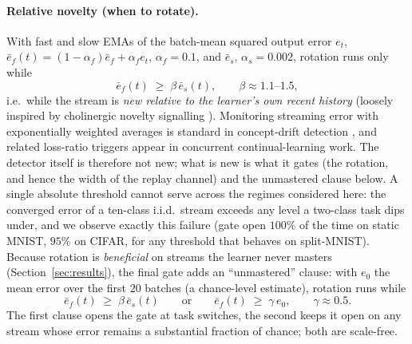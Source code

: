 \documentclass{article}
\begin{document}
\paragraph{Relative novelty (when to rotate).} With fast and slow EMAs of the batch-mean
squared output error $e_t$,
$\bar e_f(t) = (1{-}\alpha_f)\bar e_f + \alpha_f e_t$, $\alpha_f{=}0.1$, and
$\bar e_s$, $\alpha_s{=}0.002$, rotation runs only while
\begin{equation}
\bar e_f(t) \;\ge\; \beta\, \bar e_s(t), \qquad \beta \approx 1.1\text{--}1.5,
\label{eq:nov}
\end{equation}
i.e.\ while the stream is \emph{new relative to the learner's own recent history} (loosely
inspired by cholinergic novelty signalling \citep{hasselmo2006}). Monitoring streaming error
with exponentially weighted averages is standard in concept-drift detection \citep{ross2012},
and related loss-ratio triggers appear in concurrent continual-learning work. The detector
itself is therefore not new; what is new is what it gates (the rotation, and hence the width
of the replay channel) and the unmastered clause below. A single absolute threshold cannot
serve across the regimes considered here: the converged error of a ten-class i.i.d.\ stream
exceeds any level a two-class task dips under, and we observe exactly this failure (gate open
$100\%$ of the time on static MNIST, $95\%$ on CIFAR, for any threshold that behaves on
split-MNIST).
Because rotation is \emph{beneficial} on streams the learner never masters
(Section~\ref{sec:results}), the final gate adds an ``unmastered'' clause: with $e_0$ the mean
error over the first $20$ batches (a chance-level estimate), rotation runs while
\begin{equation}
\bar e_f(t) \;\ge\; \beta\,\bar e_s(t)
\qquad\text{or}\qquad
\bar e_f(t) \;\ge\; \gamma\, e_0,
\qquad \gamma\approx0.5 .
\label{eq:prog}
\end{equation}
The first clause opens the gate at task switches, the second keeps it open on any stream whose
error remains a substantial fraction of chance; both are scale-free.
\end{document}
